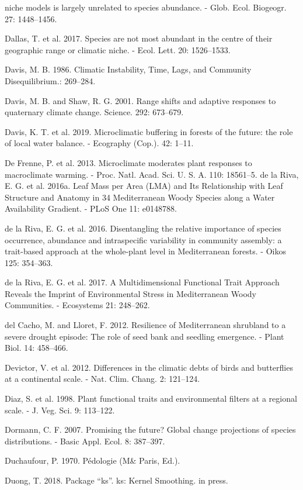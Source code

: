 \documentclass[11pt,twoside]{reedthesis}
\begin{document}
niche models is largely unrelated to species abundance. - Glob. Ecol.
Biogeogr. 27: 1448--1456.\par
Dallas, T. et al. 2017. Species are not most abundant in the centre of
their geographic range or climatic niche. - Ecol. Lett. 20:
1526--1533.\par
Davis, M. B. 1986. Climatic Instability, Time, Lags, and Community
Disequilibrium.: 269--284.\par
Davis, M. B. and Shaw, R. G. 2001. Range shifts and adaptive responses
to quaternary climate change. Science. 292: 673--679.\par
Davis, K. T. et al. 2019. Microclimatic buffering in forests of the
future: the role of local water balance. - Ecography (Cop.). 42:
1--11.\par
De Frenne, P. et al. 2013. Microclimate moderates plant responses to
macroclimate warming. - Proc. Natl. Acad. Sci. U. S. A. 110: 18561--5.
de la Riva, E. G. et al. 2016a. Leaf Mass per Area (LMA) and Its
Relationship with Leaf Structure and Anatomy in 34 Mediterranean Woody
Species along a Water Availability Gradient. - PLoS One 11:
e0148788.\par
de la Riva, E. G. et al. 2016. Disentangling the relative importance of
species occurrence, abundance and intraspecific variability in community
assembly: a trait-based approach at the whole-plant level in
Mediterranean forests. - Oikos 125: 354--363.\par
de la Riva, E. G. et al. 2017. A Multidimensional Functional Trait
Approach Reveals the Imprint of Environmental Stress in Mediterranean
Woody Communities. - Ecosystems 21: 248--262.\par
del Cacho, M. and Lloret, F. 2012. Resilience of Mediterranean shrubland
to a severe drought episode: The role of seed bank and seedling
emergence. - Plant Biol. 14: 458--466.\par
Devictor, V. et al. 2012. Differences in the climatic debts of birds and
butterflies at a continental scale. - Nat. Clim. Chang. 2: 121--124.\par
Diaz, S. et al. 1998. Plant functional traits and environmental filters
at a regional scale. - J. Veg. Sci. 9: 113--122.\par
Dormann, C. F. 2007. Promising the future? Global change projections of
species distributions. - Basic Appl. Ecol. 8: 387--397.\par
Duchaufour, P. 1970. Pédologie (M\& Paris, Ed.).\par
Duong, T. 2018. Package ``ks''. ks: Kernel Smoothing. in press.\par
\end{document}
